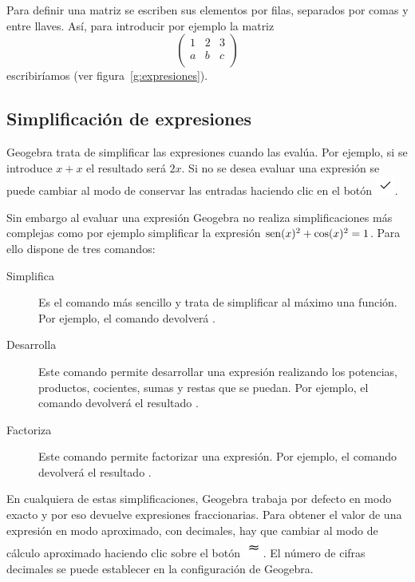 Para definir una matriz se escriben sus elementos por filas, separados por comas y entre llaves.
Así, para introducir por ejemplo la matriz
\[
\left(
\begin{array}{ccc}
1 & 2 & 3 \\
a & b & c \\
\end{array}
\right)
\]
escribiríamos  (ver figura~\ref{g:expresiones}).


\subsection*{Simplificación de expresiones}
Geogebra trata de simplificar las expresiones cuando las evalúa.
Por ejemplo, si se introduce $x+x$ el resultado será $2x$.
Si no se desea evaluar una expresión se puede cambiar al modo de conservar las entradas haciendo clic en el botón \includegraphics[scale=0.03]{img/introduccion/keep-input-button}.

Sin embargo al evaluar una expresión Geogebra no realiza simplificaciones más complejas como por ejemplo simplificar la expresión $\operatorname{sen}(x)^2+\cos(x)^2=1$.
Para ello dispone de tres comandos:
\begin{description}
\item[Simplifica] Es el comando más sencillo y trata de simplificar al máximo una función.
      Por ejemplo, el comando  devolverá .
\item[Desarrolla] Este comando permite desarrollar una expresión realizando los potencias, productos, cocientes, sumas y restas que se puedan.
      Por ejemplo, el comando  devolverá el resultado .
\item[Factoriza] Este comando permite factorizar una expresión.
      Por ejemplo, el comando  devolverá el resultado .
\end{description}

En cualquiera de estas simplificaciones, Geogebra trabaja por defecto en modo exacto y por eso devuelve expresiones fraccionarias.
Para obtener el valor de una expresión en modo aproximado, con decimales, hay que cambiar al modo de cálculo aproximado haciendo clic sobre el botón \includegraphics[scale=0.03]{img/introduccion/approximate-button}.
El número de cifras decimales se puede establecer en la configuración de Geogebra.

